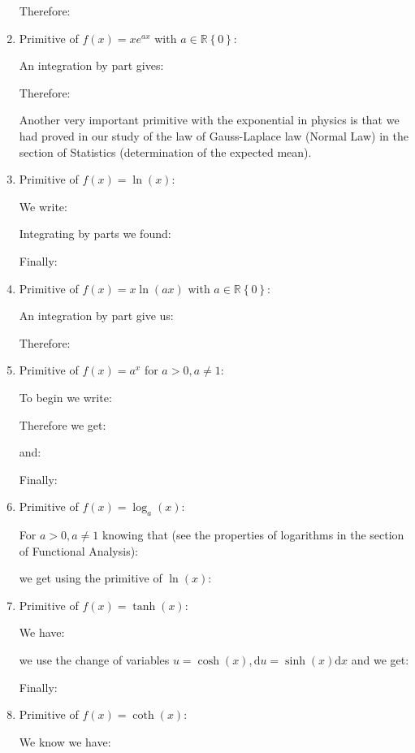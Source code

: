 \begin{enumerate}
		Therefore:
		
		\item Primitive of $f(x)=xe^{ax}$ with $a\in \mathbb{R}\left\lbrace 0 \right\rbrace$:
		
		An integration by part gives:
		
		Therefore:
		
		\begin{tcolorbox}[title=Remark,colframe=black,arc=10pt]
		Another very important primitive with the exponential in physics is that we had proved in our study of the law of Gauss-Laplace law (Normal Law) in the section of Statistics (determination of the expected mean).
		\end{tcolorbox}
		\item Primitive of $f(x)=\ln(x)$:
		
		We write:
		
		Integrating by parts we found:
		
		Finally:
		
		\item Primitive of $f(x)=x\ln(ax)$ with $a\in \mathbb{R}\left\lbrace 0 \right\rbrace$:
		
		An integration by part give us:
		
		Therefore:
		
		\item Primitive of $f(x)=a^x$ for $a>0,a\neq 1$:
		
		To begin we write:
		
		Therefore we get:
		
		and:
		
		Finally:
		
		\item Primitive of $f(x)=\log_a(x)$:
		
		For $a>0,a\neq 1$ knowing that (see the properties of logarithms in the section of Functional Analysis):
		
		we get using the primitive of $\ln(x)$:
		
		\item Primitive of $f(x)=\tanh(x)$:
		
		We have:
		
		we use the change of variables $u=\cosh(x),\mathrm{d}u=\sinh(x)\mathrm{d}x$ and we get:
		
		Finally:
		
		\item Primitive of $f(x)=\coth(x)$:
		
		We know we have:
		

\end{enumerate}
